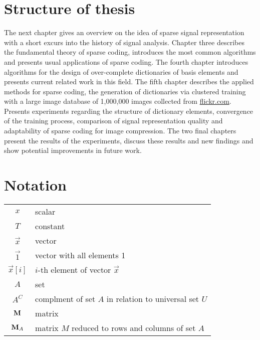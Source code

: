 \section{Structure of thesis}
The next chapter gives an overview on the idea of sparse signal
representation with a short excurs into the history of signal analysis.
Chapter three describes the fundamental theory of sparse coding, introduces the
most common algorithms and presents usual applications of sparse coding. The
fourth chapter introduces algorithms for the design of over-complete
dictionaries of basis elements and presents current related work in this field.
The fifth chapter describes the applied methods for sparse
coding, the generation of dictionaries via clustered training with a large image
database of 1,000,000 images collected from \url{flickr.com}. Presents
experiments regarding the structure of dictionary elements, convergence of the
training process, comparison of signal representation quality and adaptability
of sparse coding for image compression. The two final chapters present the
results of the experiments, discuss these results and new findings and show
potential improvements in future work. 

\section*{Notation}
\begin{tabular}{c l}
$x$ & scalar\\
$T$ & constant\\
$\vec{x}$ & vector\\
$\vec{1}$ & vector with all elements 1\\
$\vec{x}[i]$ & $i$-th element of vector $\vec{x}$\\
$A$ & set\\
$A^C$ & complment of set $A$ in relation to universal set $U$\\ 
$\boldsymbol{\mathrm{M}}$ & matrix\\
$\boldsymbol{\mathrm{M}}_A$ & matrix $M$ reduced to rows and columns of set $A$ \\

\end{tabular}



